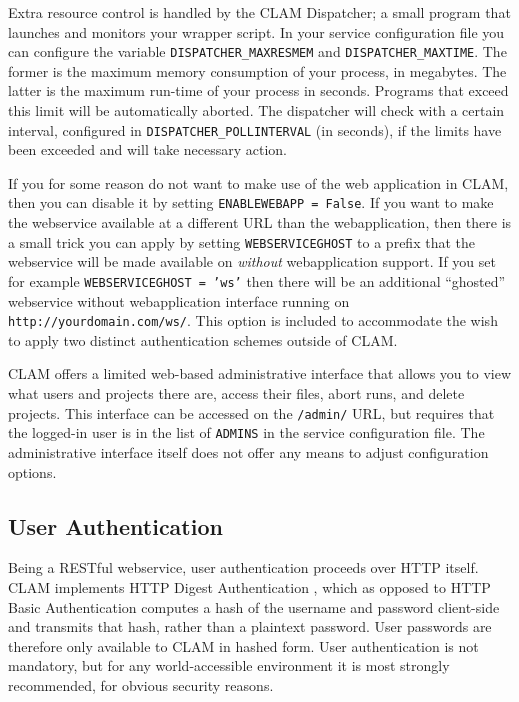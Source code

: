 \documentclass[a4paper,12pt]{report}
\begin{document}
Extra resource control is handled by the CLAM Dispatcher; a small program that
launches and monitors your wrapper script. In your service configuration file
you can configure the variable \texttt{DISPATCHER\_MAXRESMEM} and
\texttt{DISPATCHER\_MAXTIME}. The former is the maximum memory consumption of
your process, in megabytes. The latter is the maximum run-time of your process
in seconds. Programs that exceed this limit will be automatically aborted. The
dispatcher will check with a certain interval, configured in
\texttt{DISPATCHER\_POLLINTERVAL} (in seconds), if the limits have been
exceeded and will take necessary action.  
  

If you for some reason do not want to make use of the web application in CLAM,
then you can disable it by setting \texttt{ENABLEWEBAPP = False}. If you want
to make the webservice available at a different URL than the webapplication,
then there is a small trick you can apply by setting \texttt{WEBSERVICEGHOST}
to a prefix that the webservice will be made available on \emph{without}
webapplication support. If you set for example \texttt{WEBSERVICEGHOST = 'ws'}
then there will be an additional ``ghosted'' webservice without webapplication
interface running on \texttt{http://yourdomain.com/ws/}. This option is
included to accommodate the wish to apply two distinct authentication schemes
outside of CLAM. 

CLAM offers a limited web-based administrative interface that allows you to
view what users and projects there are,  access their files, abort runs, and
delete projects. This interface can be accessed on the \texttt{/admin/} URL,
but requires that the logged-in user is in the list of \texttt{ADMINS} in the
service configuration file. The administrative interface itself does not offer
any means to adjust configuration options.

\subsection{User Authentication}

Being a RESTful webservice, user authentication proceeds over HTTP itself. CLAM
implements HTTP Digest Authentication \citep{HTTPAUTH}, which as opposed to HTTP Basic
Authentication computes a hash of the username and password client-side and
transmits that hash, rather than a plaintext password. User passwords are
therefore only available to CLAM in hashed form. User authentication is not
mandatory, but for any world-accessible environment it is most strongly
recommended, for obvious security reasons. 
\end{document}

